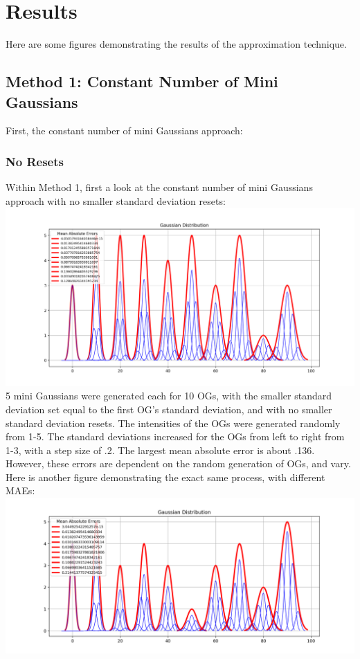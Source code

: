 \documentclass{article}
\begin{document}
\newpage
\section*{Results}
Here are some figures demonstrating the results of the approximation technique. \\
\subsection*{Method 1: Constant Number of Mini Gaussians} 
First, the constant number of mini Gaussians approach: \\
\subsubsection*{No Resets} 
Within Method 1, first a look at the constant number of mini Gaussians approach with no smaller standard deviation resets: \\
\includegraphics[scale = .6,trim= 2in 0.1in 2in 0in]{noreset.png} \\
5 mini Gaussians were generated each for 10 OGs, with the smaller standard deviation set equal to the first OG's standard deviation, and with no smaller standard deviation resets. The intensities of the OGs were generated randomly from 1-5. The standard deviations increased for the OGs from left to right from 1-3, with a step size of .2. The largest mean absolute error is about .136. However, these errors are dependent on the random generation of OGs, and vary. Here is another figure demonstrating the exact same process, with different MAEs: \\
\includegraphics[scale = .6,trim= 2in 0.1in 2in 0in]{noreset2.png} \\
\end{document}
